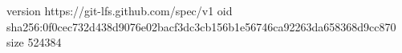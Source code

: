 version https://git-lfs.github.com/spec/v1
oid sha256:0f0cec732d438d9076e02bacf3dc3cb156b1e56746ca92263da658368d9cc870
size 524384
